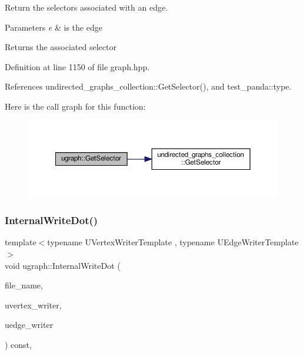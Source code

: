 Return the selectors associated with an edge. 


\begin{DoxyParams}{Parameters}
{\em e} & is the edge \\
\hline
\end{DoxyParams}
\begin{DoxyReturn}{Returns}
the associated selector 
\end{DoxyReturn}


Definition at line 1150 of file graph.\+hpp.



References undirected\+\_\+graphs\+\_\+collection\+::\+Get\+Selector(), and test\+\_\+panda\+::type.

Here is the call graph for this function\+:
\nopagebreak
\begin{figure}[H]
\begin{center}
\leavevmode
\includegraphics[width=350pt]{dd/d30/structugraph_ae606e9e0d909d9658c45f103cbf33d91_cgraph}
\end{center}
\end{figure}
\mbox{\label{structugraph_a8a91921c8f9c459cbcd24c8ade0b6c77}} 
\subsubsection{\texorpdfstring{Internal\+Write\+Dot()}{InternalWriteDot()}}
{\footnotesize\ttfamily template$<$typename U\+Vertex\+Writer\+Template , typename U\+Edge\+Writer\+Template $>$ \\
void ugraph\+::\+Internal\+Write\+Dot (\begin{DoxyParamCaption}\item[{const std\+::string \&}]{file\+\_\+name,  }\item[{const U\+Vertex\+Writer\+Const\+Ref}]{uvertex\+\_\+writer,  }\item[{const U\+Edge\+Writer\+Const\+Ref}]{uedge\+\_\+writer }\end{DoxyParamCaption}) const\hspace{0.3cm}{\ttfamily [inline]}, {\ttfamily [protected]}}



